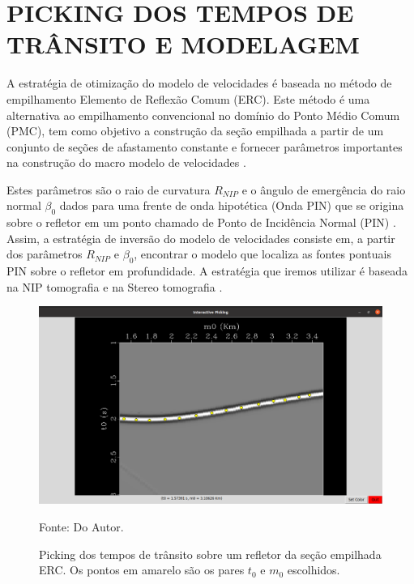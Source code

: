 \chapter{PICKING DOS TEMPOS DE TRÂNSITO E MODELAGEM}
\label{cap2}

A estratégia de otimização do modelo de velocidades é baseada no método de empilhamento Elemento de Reflexão Comum (ERC).
Este método é uma alternativa ao empilhamento convencional no domínio do Ponto Médio Comum (PMC), tem como
objetivo a construção da seção empilhada a partir de um conjunto de seções de afastamento constante e
fornecer parâmetros importantes na construção do macro modelo de velocidades \cite{cre}.

Estes parâmetros são o raio de curvatura $R_{NIP}$ e o ângulo de emergência do raio normal $\beta_0$ dados para
uma frente de onda hipotética (Onda PIN) que se origina sobre o refletor em um ponto chamado de Ponto de Incidência Normal
(PIN) \cite{hubral}. Assim, a estratégia de inversão do modelo de velocidades consiste em, a partir dos parâmetros $R_{NIP}$
e $\beta_0$, encontrar o modelo que localiza as fontes pontuais PIN sobre o refletor em profundidade.
A estratégia que iremos utilizar é baseada na NIP tomografia \cite{niptomo} e na Stereo tomografia \cite{stereo}.

\begin{figure}[H]
\caption{Picking dos tempos de trânsito sobre um refletor da seção empilhada ERC. Os pontos
em amarelo são os pares $t_0$ e $m_0$ escolhidos.}
\begin{center}
\includegraphics[scale=0.3]{images/picking.png}
\vspace{-0.3cm}
\end{center}
\begin{center}
 Fonte: Do Autor.
\end{center}
\label{fig:2.1}
\end{figure}

